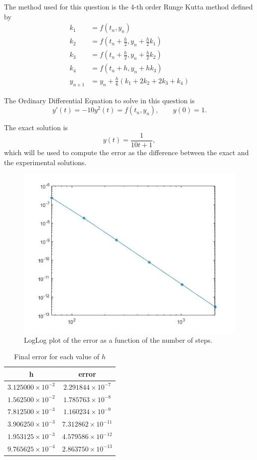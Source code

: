 \documentclass[a4paper, 11pt]{article}
\begin{document}
			The method used for this question is the 4-th order Runge Kutta method defined by
			\begin{align}
				k_1 &= f(t_n,y_n) \\
				k_2 &= f\left(t_n+\frac{h}{2},y_n + \frac{h}{2}k_1\right) \\
				k_3 &= f\left(t_n+\frac{h}{2},y_n + \frac{h}{2}k_2\right)\\
				k_4 &= f\left(t_n+h,y_n + hk_3\right) \\
				y_{n+1} &= y_n + \frac{h}{6} \left(k_1 + 2k_2 + 2k_3 + k_4 \right)
			\end{align}
		
			The Ordinary Differential Equation to solve in this question is 
			\begin{equation}
				y'(t) = -10y^2(t) = f(t_n,y_n),	\qquad y(0) =1.
			\end{equation}
		
			The exact solution is 
			\begin{equation}
				y(t) = \frac{1}{10t + 1},
			\end{equation}
			which will be used to compute the error as the difference between the exact and the experimental solutions.
			
			\begin{figure}[H]
				\centering
				\includegraphics[width=.6\linewidth]{ex2.jpg}
				\caption{LogLog plot of the error as a function of the number of steps.}
				\label{fig:ex2}
			\end{figure}
			
			\begin{table}[H]
				\centering
				\begin{tabular}{c|c}
					\textbf{h}& \textbf{error}   \\ \hline
					$ 3.125000\times 10^{-2} $ & $ 2.291844\times 10^{-7} $ \\ \hline
					$ 1.562500\times 10^{-2} $ & $ 1.785763\times 10^{-8} $ \\ \hline
					$ 7.812500\times 10^{-3} $ & $ 1.160234\times 10^{-9} $ \\ \hline
					$ 3.906250\times 10^{-3} $ & $ 7.312862\times 10^{-11} $ \\ \hline
					$ 1.953125\times 10^{-3} $ & $ 4.579586\times 10^{-12} $ \\ \hline
					$ 9.765625\times 10^{-4} $ & $ 2.863750\times 10^{-13} $ \\ \hline	
				\end{tabular}
				\caption{Final error for each value of $h$}
				\label{table:ex2}
			\end{table}
		
\end{document}
